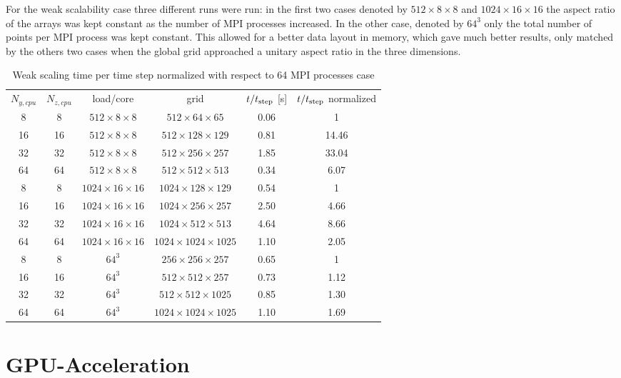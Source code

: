 For the weak scalability case three different runs were run: in the first two cases denoted by $512\times8\times8$ and $1024\times16\times16$ the aspect ratio of the arrays was kept constant as the number of MPI processes increased. In the other case, denoted by $64^3$ only the total number of points per MPI process was kept constant. This allowed for a better data layout in memory, which gave much better results, only matched by the others two cases when the global grid approached a unitary aspect ratio in the three dimensions.
\begin{table}[H]
\centering
\caption{Weak scaling time per time step normalized with respect to 64 MPI processes case}
\begin{tabular}{c|c|c|c|c|c}
$N_{y,cpu}$ & $N_{z,cpu}$& load/core & grid & $t/t_{\textnormal{step}}$ [s] &$t/t_{\textnormal{step}}$ normalized\\[1.5ex]
8& 8 & $512\times8\times8$  &$512\times64\times65$ &  0.06 & 1\\
16 &16&$512\times8\times8$  & $512\times128\times129$& 0.81 & 14.46\\
32 &32&$512\times8\times8$  & $512\times256\times257$& 1.85 & 33.04\\
64 &64 &$512\times8\times8$  &$512\times512\times513$ & 0.34 & 6.07 \\
\hline
8& 8&$1024\times16\times16$  & $1024\times128\times129$ &0.54 &1 \\
16& 16& $1024\times16\times16$  & $1024\times256\times257$ &2.50 & 4.66\\
32 &32 &$1024\times16\times16$  & $1024\times512\times513$ &4.64 & 8.66\\
64 &64 &$1024\times16\times16$  & $1024\times1024\times1025$ &1.10 & 2.05\\
\hline
8& 8 & $64^3$& $256\times256\times257$ & 0.65& 1\\
16& 16&$64^3$&$512\times512\times257$ & 0.73 &1.12 \\
32& 32 &$64^3$&$512\times512\times1025$ &0.85 & 1.30 \\
64& 64 &$64^3$&$1024\times1024\times1025$ &1.10 &1.69 \\ 
\end{tabular}
\end{table}



\section{GPU-Acceleration}
\label{sec: acceleration}

